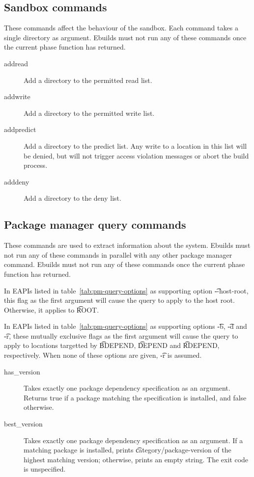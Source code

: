 \subsection{Sandbox commands}
These commands affect the behaviour of the sandbox. Each command takes a single directory as
argument. Ebuilds must not run any of these commands once the current phase function has returned.
\begin{description}
\item[addread] Add a directory to the permitted read list.
\item[addwrite] Add a directory to the permitted write list.
\item[addpredict] Add a directory to the predict list. Any write to a location in this list will be
    denied, but will not trigger access violation messages or abort the build process.
\item[adddeny] Add a directory to the deny list.
\end{description}

\subsection{Package manager query commands}
These commands are used to extract information about the system. Ebuilds must not run any of
these commands in parallel with any other package manager command. Ebuilds must not run any of
these commands once the current phase function has returned.

 In EAPIs listed in table~\ref{tab:pm-query-options} as supporting
option \t{-{}-host-root}, this flag as the first argument will cause the query to apply to the
host root. Otherwise, it applies to \t{ROOT}.

In EAPIs listed in table~\ref{tab:pm-query-options} as supporting options \t{-b}, \t{-d} and \t{-r},
these mutually exclusive flags as the first argument will cause the query to apply to locations
targetted by \t{BDEPEND}, \t{DEPEND} and \t{RDEPEND}, respectively. When none of these options
are given, \t{-r} is assumed.

\begin{description}
\item[has_version] Takes exactly one package dependency specification as an argument. Returns
    true if a package matching the specification is installed, and false otherwise.
\item[best_version] Takes exactly one package dependency specification as an argument. If a matching
    package is installed, prints \t{category/package-version} of the highest matching version;
    otherwise, prints an empty string. The exit code is unspecified.
\end{description}

